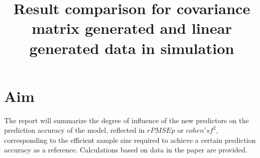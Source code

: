 \documentclass[11pt]{article}
\begin{document}
\thispagestyle{fancy}

\title{\bf Result comparison for covariance matrix generated and linear generated data in simulation}
\date{}
\maketitle
% 
%
%
%
%
%

\section{Aim}

The report will summarize the degree of influence of the new predictors on the prediction accuracy of the model, reflected in $rPMSEp$ or $cohen's f^2$, corresponding to the efficient sample size required to achieve a certain prediction accuracy as a reference. Calculations based on data in the paper are provided.


    





%
\end{document}
